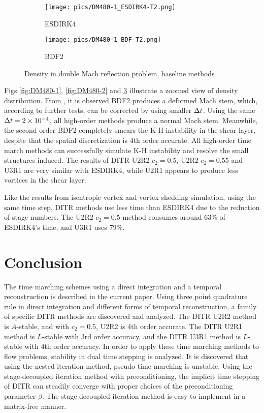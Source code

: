 \begin{figure}[htbp]
    \centering
    \begin{subfigure}{0.5\textwidth}
        \texttt{[image: pics/DM480-1\_ESDIRK4-T2.png]}
        \caption[]{ESDIRK4}
        \label{sfig:DM480_ESDIRK4}
    \end{subfigure}\hfill
    \begin{subfigure}{0.5\textwidth}
        \texttt{[image: pics/DM480-1\_BDF-T2.png]}
        \caption[]{BDF2}
        \label{sfig:DM480_BDF2}
    \end{subfigure}
    \caption{Density in double Mach reflection problem, baseline methods}
    \label{fig:DM480-3}
\end{figure}

Figs.\ref{fig:DM480-1}, \ref{fig:DM480-2} and \ref{fig:DM480-3}
illustrate a zoomed view of density distribution.
From  ,
it is observed BDF2 produces
a deformed Mach stem, which, according
to further tests, can be
corrected by using smaller ${\Delta} t$.
Using the same ${\Delta} t= 2\times10^{-4}$,
all high-order methods produce a
normal Mach stem.
Meanwhile, the second order BDF2
completely smears the K-H instability
in the shear layer, despite that the spatial
discretization is 4th order accurate.
All high-order time march methods can successfully
simulate K-H instability and resolve the
small structures induced.
The results of DITR U2R2 $c_2=0.5$, U2R2  $c_2=0.55$
and U3R1 are very similar with ESDIRK4, while U2R1
appears to produce less vortices in the shear layer.

Like the results from isentropic vortex and vortex shedding simulation,
using the same time step, DITR methods
use less time than ESDIRK4 due to the reduction of stage numbers.
The U2R2 $c_2=0.5$ method consumes around $63\%$ of ESDIRK4's time,
and U3R1 uses $79\%$.



\section{Conclusion}
\label{sec:Conc}

The time marching schemes using a
direct integration and a temporal reconstruction is
described in the current paper.
Using three point quadrature rule in direct integration and different
forms of temporal reconstruction, a family of
specific DITR methods are discovered and analyzed.
The DITR U2R2 method is $A$-stable, and with $c_2=0.5$, U2R2 is 4th order accurate.
The DITR U2R1 method is $L$-stable with 3rd order accuracy, and
the DITR U3R1 method is $L$-stable with 4th order accuracy.
In order to apply these time marching methods to flow problems,
stability in dual time stepping is analyzed.
It is discovered that using the nested iteration method, pseudo time marching is unstable.
Using the stage-decoupled iteration method with preconditioning,
the implicit time stepping of DITR can steadily converge with proper choices of
the preconditioning parameter $\beta$.
The stage-decoupled iteration method is easy to implement in a
matrix-free manner.

